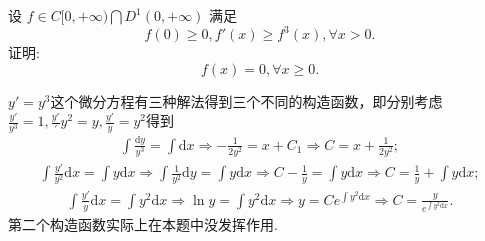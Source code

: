 \documentclass[../../main.tex]{subfiles}
\begin{document}
\begin{example}
设 \( f \in C[0,+\infty) \bigcap D^1(0,+\infty) \) 满足
\[
f(0) \geqslant 0, f'(x) \geqslant f^3(x), \forall x > 0.
\]
证明:
\[
f(x) = 0, \forall x \geqslant 0.
\]
\end{example}
\begin{note}
$y' = y^3$这个微分方程有三种解法得到三个不同的构造函数，即分别考虑$\frac{y'}{y^3}=1,\frac{y'}'{y^2}=y,\frac{y'}{y}=y^2$得到
\begin{align*}
\int{\frac{\mathrm{d}y}{y^3}}=\int{\mathrm{d}x}\Longrightarrow -\frac{1}{2y^2}=x+C_1\Longrightarrow C=x+\frac{1}{2y^2};
\end{align*}
\begin{align*}
\int{\frac{y\prime}{y^2}\mathrm{d}x}=\int{y\mathrm{d}x}\Longrightarrow \int{\frac{1}{y^2}\mathrm{d}y}=\int{y\mathrm{d}x}\Longrightarrow C-\frac{1}{y}=\int{y\mathrm{d}x}\Longrightarrow C=\frac{1}{y}+\int{y\mathrm{d}x};
\end{align*}
\begin{align*}
\int{\frac{y'}{y}\mathrm{d}x}=\int{y^2\mathrm{d}x}\Longrightarrow \ln y=\int{y^2\mathrm{d}x}\Longrightarrow y=Ce^{\int{y^2\mathrm{d}x}}\Longrightarrow C=\frac{y}{e^{\int{y^2\mathrm{d}x}}}.
\end{align*}
第二个构造函数实际上在本题中没发挥作用.
\end{note}
\end{document}
